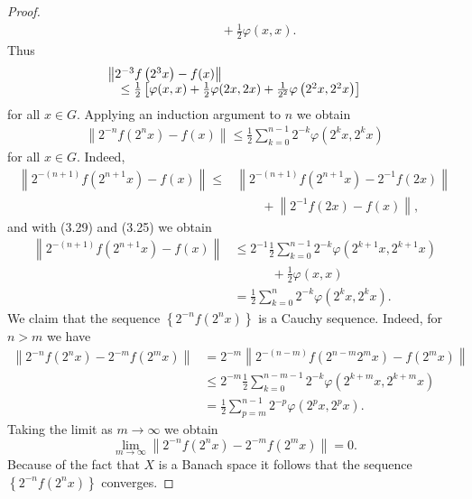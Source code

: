 \documentclass[a4paper,12pt]{report}
\begin{document}
\begin{thm}
\begin{proof}
$$\begin{aligned}
	& \quad \quad \quad +\frac{1}{2} \varphi(x, x) .
\end{aligned}
$$
Thus
\begin{eqnarray}
\begin{array}{l}
\noindent \left\|2^{-3} f\left(2^3 x\right)-f(x)\right\| \\
	\quad \le \frac{1}{2}\left[\varphi(x, x)+\frac{1}{2} \varphi(2 x, 2 x)+\frac{1}{2^2} \varphi\left(2^2 x, 2^2 x\right)\right]
\end{array}
\end{eqnarray}
for all $x \in G$.
Applying an induction argument to $n$ we obtain
\begin{eqnarray}
\left\|2^{-n} f\left(2^n x\right)-f(x)\right\| \le \frac{1}{2} \sum_{k=0}^{n-1} 2^{-k} \varphi\left(2^k x, 2^k x\right)
\end{eqnarray}
for all $x \in G$.
Indeed,
$$
\begin{aligned}
	\left\|2^{-(n+1)} f\left(2^{n+1} x\right)-f(x)\right\| \le & \left\|2^{-(n+1)} f\left(2^{n+1} x\right)-2^{-1} f(2 x)\right\| \\
	& \quad\quad +\left\|2^{-1} f(2 x)-f(x)\right\|,
\end{aligned}
$$
and with (3.29) and (3.25) we obtain
$$
\begin{aligned}
	\left\|2^{-(n+1)} f\left(2^{n+1} x\right)-f(x)\right\| & \le 2^{-1} \frac{1}{2} \sum_{k=0}^{n-1} 2^{-k} \varphi\left(2^{k+1} x, 2^{k+1} x\right)\\ 
	& \quad \quad \quad  +\frac{1}{2} \varphi(x, x) \\
	& =\frac{1}{2} \sum_{k=0}^n 2^{-k} \varphi\left(2^k x, 2^k x\right) .
\end{aligned}
$$
We claim that the sequence $\left\{2^{-n} f\left(2^n x\right)\right\}$ is a Cauchy sequence. Indeed, for $n>m$ we have
$$
\begin{aligned}
	\left\|2^{-n} f\left(2^n x\right)-2^{-m} f\left(2^m x\right)\right\| & =2^{-m}\left\|2^{-(n-m)} f\left(2^{n-m} 2^m x\right)-f\left(2^m x\right)\right\| \\
	& \le 2^{-m} \frac{1}{2} \sum_{k=0}^{n-m-1} 2^{-k} \varphi\left(2^{k+m} x, 2^{k+m} x\right) \\
	& =\frac{1}{2} \sum_{p=m}^{n-1} 2^{-p} \varphi\left(2^p x, 2^p x\right) .
\end{aligned}
$$
Taking the limit as $m \rightarrow \infty$ we obtain
$$
\lim _{m \rightarrow \infty}\left\|2^{-n} f\left(2^n x\right)-2^{-m} f\left(2^m x\right)\right\|=0 .
$$
Because of the fact that $X$ is a Banach space it follows that the sequence $\left\{2^{-n} f\left(2^n x\right)\right\}$ converges.

\end{proof}
\end{thm}
\end{document}
